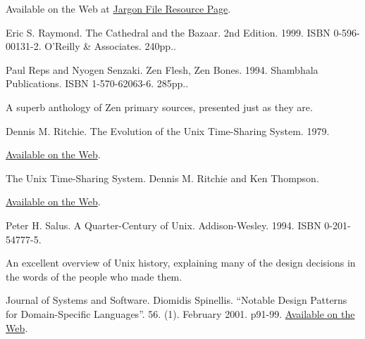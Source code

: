 \documentclass[12pt,oneside]{book}
\begin{document}
\begin{common-format}
\begin{thebibliography}{9}
Available on the Web at \href{http://www.catb.org/~esr/jargon}{Jargon File Resource Page}.

 Eric S. Raymond. The Cathedral and the Bazaar. 2nd Edition. 1999. ISBN 0-596-00131-2. O'Reilly \&{} Associates. 240pp..

 Paul Reps and Nyogen Senzaki. Zen Flesh, Zen Bones. 1994. Shambhala Publications. ISBN 1-570-62063-6. 285pp..

A superb anthology of Zen primary sources, presented just as they are.

\bibitem[Ritchie79] Dennis M. Ritchie. The Evolution of the Unix Time-Sharing System. 1979.

\href{http://cm.bell-labs.com/cm/cs/who/dmr/hist.html}{Available on the Web}.

%
%
%
%
 The Unix Time-Sharing System. Dennis M. Ritchie and Ken Thompson.

\href{http://cm.bell-labs.com/cm/cs/who/dmr/cacm.html}{Available on the Web}.



 Peter H. Salus. A Quarter-Century of Unix. Addison-Wesley. 1994. ISBN 0-201-54777-5.

An excellent overview of Unix history, explaining many of the design decisions in the words of the people who made them.

%
%
%
 Journal of Systems and Software. Diomidis Spinellis. “Notable Design Patterns for Domain-Specific Languages”. 56. (1). February 2001. p91-99. \href{http://www.catb.org/~esr/writings/taoup/html/apb.html}{Available on the Web}.


\end{thebibliography}
\end{common-format}
\end{document}
